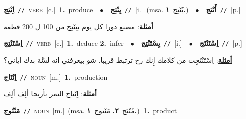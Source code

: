 \documentclass[10pt,a4paper,twoside]{article} %
\begin{document}
\begin{multicols}{2}
{{{{{{{{\setlength\topsep{0pt}\textbf{\foreignlanguage{arabic}{اِنْتِج}}\ {\color{gray}\texttt{//}\color{black}}\ \textsc{verb}\ [c.]\ \textbf{1.}~produce\ \ $\bullet$\ \ \setlength\topsep{0pt}\textbf{\foreignlanguage{arabic}{يِنْتِج}}\ {\color{gray}\texttt{//}\color{black}}\ [i.]\ \color{gray}(msa. \foreignlanguage{arabic}{يُنْتِج}~\foreignlanguage{arabic}{\textbf{١.}})\color{black}\ \ $\bullet$\ \ \setlength\topsep{0pt}\textbf{\foreignlanguage{arabic}{أَنْتَج}}\ {\color{gray}\texttt{//}\color{black}}\ [p.]\  \begin{flushright}\color{gray}\foreignlanguage{arabic}{\textbf{\underline{\foreignlanguage{arabic}{أمثلة}}}: مصنع دورا كل يوم بيِنْتِج من 100 ل 200 قطعة}\end{flushright}\color{black}} \vspace{2mm}

{\setlength\topsep{0pt}\textbf{\foreignlanguage{arabic}{اِسْتَنْتِج}}\ {\color{gray}\texttt{//}\color{black}}\ \textsc{verb}\ [c.]\ \textbf{1.}~deduce  \textbf{2.}~infer\ \ $\bullet$\ \ \setlength\topsep{0pt}\textbf{\foreignlanguage{arabic}{يِسْتَنْتِج}}\ {\color{gray}\texttt{//}\color{black}}\ [i.]\ \ $\bullet$\ \ \setlength\topsep{0pt}\textbf{\foreignlanguage{arabic}{اِسْتَنْتَج}}\ {\color{gray}\texttt{//}\color{black}}\ [p.]\  \begin{flushright}\color{gray}\foreignlanguage{arabic}{\textbf{\underline{\foreignlanguage{arabic}{أمثلة}}}: اِسْتَنْتَجِت من كلامك إِنك رح ترتبط قريبا. شو بيعرفني انه لسَّة بدك اياني؟}\end{flushright}\color{black}} \vspace{2mm}

{\setlength\topsep{0pt}\textbf{\foreignlanguage{arabic}{اِنْتَاج}}\ {\color{gray}\texttt{//}\color{black}}\ \textsc{noun}\ [m.]\ \textbf{1.}~production\  \begin{flushright}\color{gray}\foreignlanguage{arabic}{\textbf{\underline{\foreignlanguage{arabic}{أمثلة}}}: اِنْتاج التمر بأريحا ألِف ألِف}\end{flushright}\color{black}} \vspace{2mm}

{\setlength\topsep{0pt}\textbf{\foreignlanguage{arabic}{مَنْتُوج}}\ {\color{gray}\texttt{//}\color{black}}\ \textsc{noun}\ [m.]\ \color{gray}(msa. \foreignlanguage{arabic}{مُنْتَج}~\foreignlanguage{arabic}{\textbf{٢.}}  \foreignlanguage{arabic}{مَنْتوج}~\foreignlanguage{arabic}{\textbf{١.}})\color{black}\ \textbf{1.}~product\ 

}}}}}}}}
\end{multicols}
\end{document}
